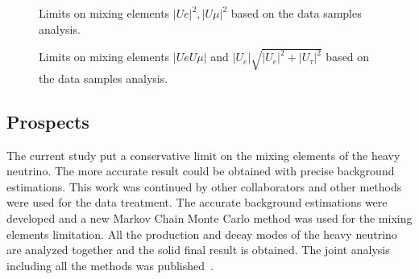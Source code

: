 \documentclass[../main.tex]{subfiles}
\begin{document}
\begin{figure}[!ht]
    \begin{center}
  \begin{minipage}{0.49\linewidth}
  \end{minipage}
  \hfill
  \begin{minipage}{0.49\linewidth}
  \end{minipage}
  \caption{Limits on mixing elements $\left|Ue\right|^2, \left|U\mu\right|^2$ based on the data samples analysis.}
  \label{fig:HNL:LimitsData1}
    \end{center}
\end{figure}

\begin{figure}[!ht]
    \begin{center}
  \begin{minipage}{0.49\linewidth}
  \end{minipage}
  \begin{minipage}{0.49\linewidth}
  \end{minipage}
  \caption{Limits on mixing elements $\left|UeU\mu\right|$ and $\left|U_{e}\right|\sqrt{\left|U_{e}\right|^2+\left|U_{\tau}\right|^2}$ based on the data samples analysis.}
  \label{fig:HNL:LimitsData2}
  \end{center}
\end{figure}

\subsection{Prospects}
\label{sec:HNL:prosp}
The current study put a conservative limit on the mixing elements of the heavy neutrino. The more accurate result could be obtained with precise background estimations. This work was continued by other collaborators and other methods were used for the data treatment. The accurate background estimations were developed and a new Markov Chain Monte Carlo method was used for the mixing elements limitation. All the production and decay modes of the heavy neutrino are analyzed together and the solid final result is obtained. The joint analysis including all the methods was published~\cite{Abe2019c}.
\end{document}
